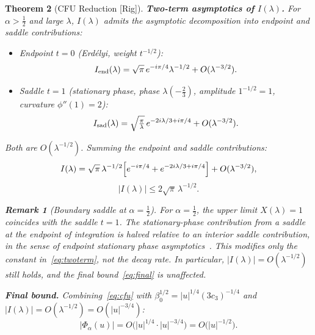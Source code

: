 \documentclass[12pt,a4paper]{amsart}
\newtheorem{theorem}{Theorem}[section]
\theoremstyle{definition}
\newtheorem{remark}[theorem]{Remark}
\newcommand{\Rig}{\textup{[Rig]}}
\begin{document}
\begin{theorem}[CFU Reduction \Rig]
\medskip
\noindent\textbf{Two-term asymptotics of $I(\lambda)$.}
For $\alpha>\tfrac{1}{2}$ and large $\lambda$,
$I(\lambda)$ admits the asymptotic decomposition
into endpoint and saddle contributions:
\begin{itemize}
\item \emph{Endpoint} $t=0$
  (Erd\'elyi, weight $t^{-1/2}$):
  \[
    I_{\rm end}(\lambda)
    = \sqrt{\pi}\,e^{-i\pi/4}
    \lambda^{-1/2}
    + O(\lambda^{-3/2}).
  \]
\item \emph{Saddle} $t=1$
  (stationary phase,
  phase $\lambda(-\tfrac{2}{3})$,
  amplitude $1^{-1/2}=1$,
  curvature $\phi''(1)=2$):
  \[
    I_{\rm sad}(\lambda)
    = \sqrt{\tfrac{\pi}{\lambda}}
    \,e^{-2i\lambda/3+i\pi/4}
    + O(\lambda^{-3/2}).
  \]
\end{itemize}
Both are $O(\lambda^{-1/2})$.
Summing the endpoint and saddle contributions:
\begin{equation}\label{eq:twoterm}
  I(\lambda)
  = \sqrt{\pi}\,\lambda^{-1/2}
  \Bigl[
    e^{-i\pi/4}
    + e^{-2i\lambda/3+i\pi/4}
  \Bigr]
  + O(\lambda^{-3/2}),
\end{equation}
\begin{equation}\label{eq:Ibound}
  |I(\lambda)|
  \le 2\sqrt{\pi}\,\lambda^{-1/2}.
\end{equation}

\begin{remark}[Boundary saddle at $\alpha=\tfrac{1}{2}$]
\label{rem:halfsaddle}
For $\alpha=\tfrac{1}{2}$, the upper limit $X(\lambda)=1$
coincides with the saddle $t=1$.
The stationary-phase contribution from a saddle
at the endpoint of integration is halved relative
to an interior saddle contribution,
in the sense of endpoint stationary phase
asymptotics~\cite{Olver1974}.
This modifies only the constant in~\eqref{eq:twoterm},
not the decay rate. In particular,
$|I(\lambda)|=O(\lambda^{-1/2})$ still holds,
and the final bound~\eqref{eq:final} is unaffected.
\end{remark}

\medskip
\noindent\textbf{Final bound.}
Combining~\eqref{eq:cfu}
with $\beta_0^{1/2}=|u|^{1/4}(3c_3)^{-1/4}$
and $|I(\lambda)|=O(\lambda^{-1/2})
=O(|u|^{-3/4})$:
\begin{equation}\label{eq:final}
  \boxed{
  |\Phi_\alpha(u)|
  = O\bigl(|u|^{1/4}\cdot|u|^{-3/4}\bigr)
  = O\bigl(|u|^{-1/2}\bigr).
  }
\end{equation}

\begin{center}
\end{center}
\end{theorem}
\end{document}
